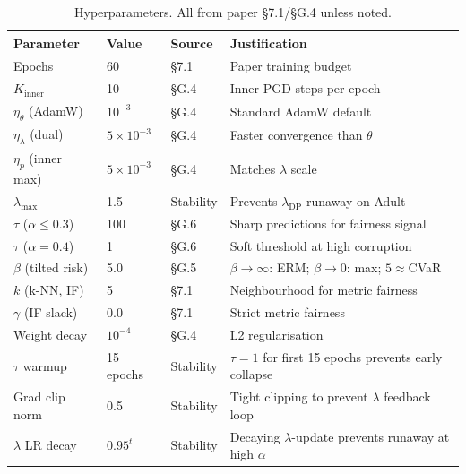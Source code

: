 \documentclass[11pt,a4paper]{article}
\newcommand{\lDP}{\lambda_{\mathrm{DP}}}
\begin{document}
\begin{table}[h]
\centering\small
\caption{Hyperparameters.  All from paper \S7.1/\S G.4 unless noted.}
\label{tab:hyperparams}
\begin{tabular}{L{3.5cm}C{1.8cm}C{1.5cm}L{7.5cm}}
\toprule
{}
\color{white}\textbf{Parameter} &
\color{white}\textbf{Value} &
\color{white}\textbf{Source} &
\color{white}\textbf{Justification} \\
\midrule
Epochs                   & 60               & \S7.1     & Paper training budget \\
$K_{\mathrm{inner}}$     & 10               & \S G.4    & Inner PGD steps per epoch \\
$\eta_\theta$ (AdamW)    & $10^{-3}$        & \S G.4    & Standard AdamW default \\
$\eta_\lambda$ (dual)    & $5\times10^{-3}$ & \S G.4    & Faster convergence than $\theta$ \\
$\eta_p$ (inner max)     & $5\times10^{-3}$ & \S G.4    & Matches $\lambda$ scale \\
$\lambda_{\max}$         & 1.5              & Stability & Prevents $\lDP$ runaway on Adult \\
$\tau$ ($\alpha\le 0.3$) & 100              & \S G.6    & Sharp predictions for fairness signal \\
$\tau$ ($\alpha=0.4$)    & 1                & \S G.6    & Soft threshold at high corruption \\
$\beta$ (tilted risk)    & 5.0              & \S G.5    & $\beta\to\infty$: ERM;\; $\beta\to 0$: max;\; $5\approx$CVaR \\
$k$ (k-NN, IF)           & 5                & \S7.1     & Neighbourhood for metric fairness \\
$\gamma$ (IF slack)      & 0.0              & \S7.1     & Strict metric fairness \\
Weight decay             & $10^{-4}$        & \S G.4    & L2 regularisation \\
$\tau$ warmup            & 15 epochs        & Stability & $\tau=1$ for first 15 epochs prevents early collapse \\
Grad clip norm           & 0.5              & Stability & Tight clipping to prevent $\lambda$ feedback loop \\
$\lambda$ LR decay       & $0.95^t$         & Stability & Decaying $\lambda$-update prevents runaway at high $\alpha$ \\
\bottomrule
\end{tabular}
\end{table}
\end{document}
